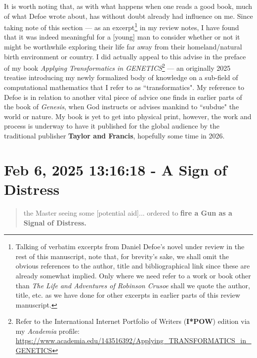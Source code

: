 \documentclass[a4paper]{article}
\begin{document}
It is worth noting that, as with what happens when one reads a good book, much of what Defoe wrote about, has without doubt already had influence on me. Since taking note of this section --- as an excerpt\footnote{Talking of verbatim excerpts from Daniel Defoe's novel under review in the rest of this manuscript, note that, for brevity's sake, we shall omit the obvious references to the author, title and bibliographical link since these are already somewhat implied. Only where we need refer to a work or book other than \textit{The Life and Adventures of Robinson Crusoe} shall we quote the author, title, etc. as we have done for other excerpts in earlier parts of this review manuscript.} in my review notes, I have found that it was indeed meaningful for a [young] man to consider whether or not it might be worthwhile exploring their life far away from their homeland/natural birth environment or country. I did actually appeal to this advise in the preface of my book \textit{Applying Transformatics in GENETICS}\footnote{Refer to the International Internet Portfolio of Writers (\textbf{I*POW}) edition via my \textit{Academia} profile: \url{https://www.academia.edu/143516392/Applying_TRANSFORMATICS_in_GENETICS}} --- an originally 2025 treatise introducing my newly formalized body of knowledge on a sub-field of computational mathematics that I refer to as ``transformatics". My reference to Defoe is in relation to another vital piece of advice one finds in earlier parts of the book of \textit{Genesis}, when God instructs or advises mankind to ``subdue" the world or nature. My book is yet to get into physical print, however, the work and process is underway to have it published for the global audience by the traditional publisher \textbf{Taylor and Francis}, hopefully some time in 2026.





\section{Feb 6, 2025 13:16:18 - A Sign of Distress}
\label{SEC5}




\noindent
\begin{minipage}{1\textwidth}
\vspace{1em}
\begin{quotation}
{\ttfamily

the Master seeing some [potential aid]... ordered to \textbf{fire a Gun as a Signal of Distress.}

}
\end{quotation}
\vspace{1em}
\end{minipage}
\end{document}
